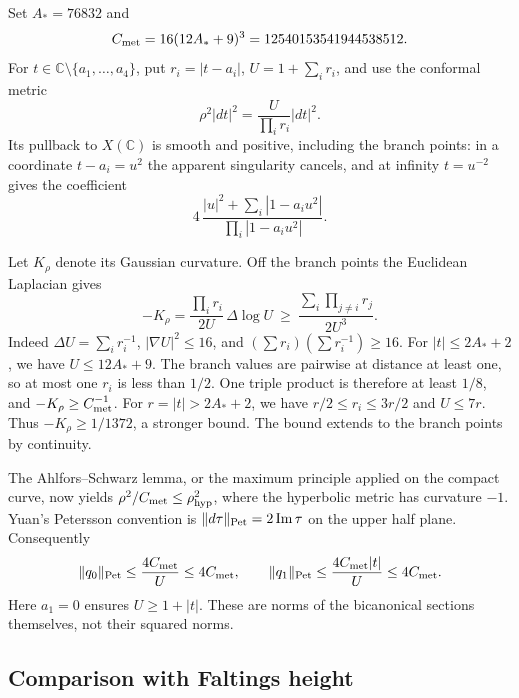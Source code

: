 \documentclass[11pt]{article}
\theoremstyle{definition}
\newcommand{\C}{\mathbb C}
\begin{document}
Set \(A_*=76832\) and
\[
 C_{\rm met}=16(12A_*+9)^3
             =12540153541944538512.
\]
For \(t\in\C\setminus\{a_1,\ldots,a_4\}\), put
\(r_i=|t-a_i|\), \(U=1+\sum_i r_i\), and use the conformal
metric
\[
                    \rho^2|dt|^2=\frac{U}{\prod_i r_i}|dt|^2.
\]
Its pullback to \(X(\C)\) is smooth and positive, including
the branch points: in a coordinate \(t-a_i=u^2\) the apparent
singularity cancels, and at infinity \(t=u^{-2}\) gives the
coefficient
\[
      4\,\frac{|u|^2+\sum_i|1-a_i u^2|}
                    {\prod_i|1-a_i u^2|}.
\]

Let \(K_\rho\) denote its Gaussian curvature. Off the branch
points the Euclidean Laplacian gives
\[
 -K_\rho=\frac{\prod_i r_i}{2U}\,\Delta\log U
 \ \ge\ \frac{\sum_i\prod_{j\ne i}r_j}{2U^3}.
\]
Indeed \(\Delta U=\sum_i r_i^{-1}\), \(|\nabla U|^2\le16\),
and \((\sum r_i)(\sum r_i^{-1})\ge16\).
For \(|t|\le2A_*+2\), we have \(U\le12A_*+9\).
The branch values are pairwise at distance at least one, so at
most one \(r_i\) is less than \(1/2\). One triple product is
therefore at least \(1/8\), and
\(-K_\rho\ge C_{\rm met}^{-1}\).
For \(r=|t|>2A_*+2\), we have \(r/2\le r_i\le3r/2\)
and \(U\le7r\). Thus \(-K_\rho\ge1/1372\), a stronger bound.
The bound extends to the branch points by continuity.

The Ahlfors--Schwarz lemma, or the maximum principle applied on
the compact curve, now yields
\(\rho^2/C_{\rm met}\le\rho_{\rm hyp}^2\), where the hyperbolic
metric has curvature \(-1\). Yuan's Petersson convention is
\(\|d\tau\|_{\rm Pet}=2\operatorname{Im}\tau\) on the upper
half plane. Consequently
\begin{equation}\label{eq:bicanonical-sup}
 \|q_0\|_{\rm Pet}\le\frac{4C_{\rm met}}U\le4C_{\rm met},
 \qquad
 \|q_1\|_{\rm Pet}\le\frac{4C_{\rm met}|t|}U\le4C_{\rm met}.
\end{equation}
Here \(a_1=0\) ensures \(U\ge1+|t|\). These are norms of
the bicanonical sections themselves, not their squared norms.

\subsection{Comparison with Faltings height}
\end{document}
